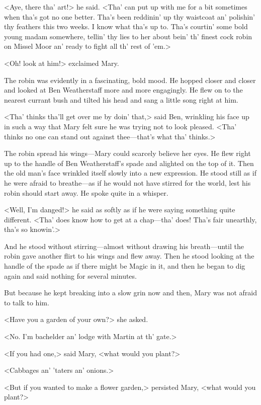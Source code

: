 <Aye, there tha' art!> he said. <Tha' can put up with me for a bit sometimes when tha's got no one better. Tha's been reddinin' up thy waistcoat an' polishin' thy feathers this two weeks. I know what tha's up to. Tha's courtin' some bold young madam somewhere, tellin' thy lies to her about bein' th' finest cock robin on Missel Moor an' ready to fight all th' rest of 'em.>

<Oh! look at him!> exclaimed Mary.

The robin was evidently in a fascinating, bold mood. He hopped closer and closer and looked at Ben Weatherstaff more and more engagingly. He flew on to the nearest currant bush and tilted his head and sang a little song right at him.

<Tha' thinks tha'll get over me by doin' that,> said Ben, wrinkling his face up in such a way that Mary felt sure he was trying not to look pleased. <Tha' thinks no one can stand out against thee—that's what tha' thinks.>

The robin spread his wings—Mary could scarcely believe her eyes. He flew right up to the handle of Ben Weatherstaff's spade and alighted on the top of it. Then the old man's face wrinkled itself slowly into a new expression. He stood still as if he were afraid to breathe—as if he would not have stirred for the world, lest his robin should start away. He spoke quite in a whisper.

<Well, I'm danged!> he said as softly as if he were saying something quite different. <Tha' does know how to get at a chap—tha' does! Tha's fair unearthly, tha's so knowin'.>

And he stood without stirring—almost without drawing his breath—until the robin gave another flirt to his wings and flew away. Then he stood looking at the handle of the spade as if there might be Magic in it, and then he began to dig again and said nothing for several minutes.

But because he kept breaking into a slow grin now and then, Mary was not afraid to talk to him.

<Have you a garden of your own?> she asked.

<No. I'm bachelder an' lodge with Martin at th' gate.>

<If you had one,> said Mary, <what would you plant?>

<Cabbages an' 'taters an' onions.>

<But if you wanted to make a flower garden,> persisted Mary, <what would you plant?>

